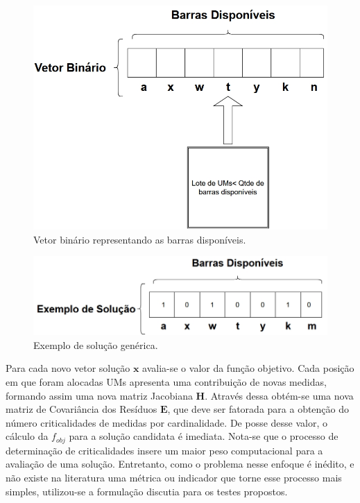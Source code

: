 \documentclass[12pt]{article}
\begin{document}
\begin{figure}[H]
	\centering 
	\includegraphics[scale=0.6]{figuras/vetor_bin.jpg}
	\caption{Vetor binário representando as barras disponíveis.}
	\label{fig6} %
\end{figure}

\begin{figure}[H]
	\centering 
	\includegraphics[scale=0.6]{figuras/exemplo_generico.jpg}
	\caption{Exemplo de solução genérica.}
	\label{fig7} %
\end{figure}

Para cada novo vetor solução $\mathbf{x}$ avalia-se o valor da função objetivo. Cada posição em que foram alocadas UMs apresenta uma contribuição de novas medidas, formando assim uma nova matriz Jacobiana $\mathbf{H}$. Através dessa obtém-se uma nova matriz de Covariância dos Resíduos $\mathbf{E}$, que deve ser fatorada para a obtenção do número criticalidades de medidas por cardinalidade. De posse desse valor, o cálculo da $f_{obj}$ para a solução candidata é imediata. Nota-se que o processo de determinação de criticalidades insere um maior peso computacional para a avaliação de uma solução. Entretanto, como o problema nesse enfoque é inédito, e não existe na literatura uma métrica ou indicador que torne esse processo mais simples, utilizou-se a formulação discutia para os testes propostos.
\end{document}
